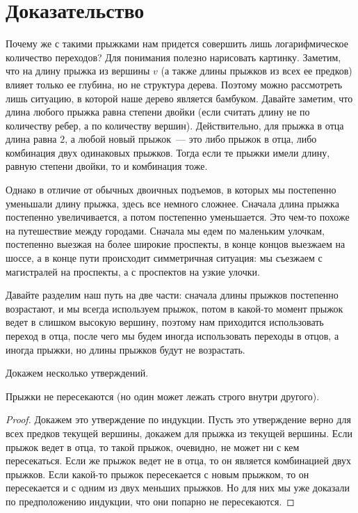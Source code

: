 \section{Доказательство}

Почему же с такими прыжками нам придется совершить лишь логарифмическое количество переходов? Для понимания полезно нарисовать картинку. Заметим, что на длину прыжка из вершины $v$ (а также длины прыжков из всех ее предков) влияет только ее глубина, но не структура дерева. Поэтому можно рассмотреть лишь ситуацию, в которой наше дерево является бамбуком. Давайте заметим, что длина любого прыжка равна степени двойки (если считать длину не по количеству ребер, а по количеству вершин). Действительно, для прыжка в отца длина равна $2$, а любой новый прыжок~--- это либо прыжок в отца, либо комбинация двух одинаковых прыжков. Тогда если те прыжки имели длину, равную степени двойки, то и комбинация тоже.

Однако в отличие от обычных двоичных подъемов, в которых мы постепенно уменьшали длину прыжка, здесь все немного сложнее. Сначала длина прыжка постепенно увеличивается, а потом постепенно уменьшается. Это чем-то похоже на путешествие между городами. Сначала мы едем по маленьким улочкам, постепенно выезжая на более широкие проспекты, в конце концов выезжаем на шоссе, а в конце пути происходит симметричная ситуация: мы съезжаем с магистралей на проспекты, а с проспектов на узкие улочки.

Давайте разделим наш путь на две части: сначала длины прыжков постепенно возрастают, и мы всегда используем прыжок, потом в какой-то момент прыжок ведет в слишком высокую вершину, поэтому нам приходится использовать переход в отца, после чего мы будем иногда использовать переходы в отцов, а иногда прыжки, но длины прыжков будут не возрастать.

Докажем несколько утверждений.

\begin{theorem}
    Прыжки не пересекаются (но один может лежать строго внутри другого).
\end{theorem}

\begin{proof}
    Докажем это утверждение по индукции. Пусть это утверждение верно для всех предков текущей вершины, докажем для прыжка из текущей вершины.
    Если прыжок ведет в отца, то такой прыжок, очевидно, не может ни с кем пересекаться. Если же прыжок ведет не в отца, то он является комбинацией двух прыжков. Если какой-то прыжок пересекается с новым прыжком, то он пересекается и с одним из двух меньших прыжков. Но для них мы уже доказали по предположению индукции, что они попарно не пересекаются.
\end{proof}

